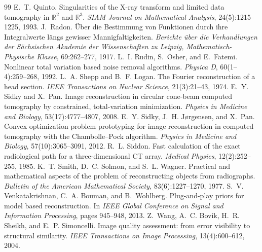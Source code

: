 \documentclass[11pt,a4paper]{article}
\numberwithin{equation}{section}
\theoremstyle{remark}
\begin{document}
\begin{thebibliography}{99}
 E.~T. Quinto. Singularities of the {X}-ray transform and limited data tomography in $\mathbb{R}^2$ and $\mathbb{R}^3$. \emph{SIAM Journal on Mathematical Analysis}, 24(5):1215--1225, 1993.
 J.~Radon. {\"U}ber die {B}estimmung von {F}unktionen durch ihre {I}ntegralwerte l{\"a}ngs gewisser {M}annigfaltigkeiten. \emph{Berichte {\"u}ber die Verhandlungen der S{\"a}chsischen Akademie der Wissenschaften zu Leipzig, Mathematisch-Physische Klasse}, 69:262--277, 1917.
 L.~I. Rudin, S.~Osher, and E.~Fatemi. Nonlinear total variation based noise removal algorithms. \emph{Physica D}, 60(1--4):259--268, 1992.
 L.~A. Shepp and B.~F. Logan. The {F}ourier reconstruction of a head section. \emph{IEEE Transactions on Nuclear Science}, 21(3):21--43, 1974.
 E.~Y. Sidky and X.~Pan. Image reconstruction in circular cone-beam computed tomography by constrained, total-variation minimization. \emph{Physics in Medicine and Biology}, 53(17):4777--4807, 2008.
 E.~Y. Sidky, J.~H. J{\o}rgensen, and X.~Pan. Convex optimization problem prototyping for image reconstruction in computed tomography with the {C}hambolle--{P}ock algorithm. \emph{Physics in Medicine and Biology}, 57(10):3065--3091, 2012.
 R.~L. Siddon. Fast calculation of the exact radiological path for a three-dimensional {CT} array. \emph{Medical Physics}, 12(2):252--255, 1985.
 K.~T. Smith, D.~C. Solmon, and S.~L. Wagner. Practical and mathematical aspects of the problem of reconstructing objects from radiographs. \emph{Bulletin of the American Mathematical Society}, 83(6):1227--1270, 1977.
 S.~V. Venkatakrishnan, C.~A. Bouman, and B.~Wohlberg. Plug-and-play priors for model based reconstruction. In \emph{IEEE Global Conference on Signal and Information Processing}, pages 945--948, 2013.
 Z.~Wang, A.~C. Bovik, H.~R. Sheikh, and E.~P. Simoncelli. Image quality assessment: from error visibility to structural similarity. \emph{IEEE Transactions on Image Processing}, 13(4):600--612, 2004.
\end{thebibliography}
\endgroup
\end{document}
